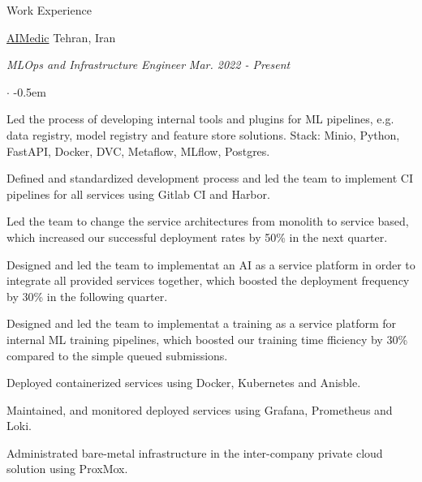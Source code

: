 \documentclass[../professional-cv.tex]{subfiles}
\begin{document}
	\begin{rSection}{Work Experience}
		
		\begin{rWorkSection}
			{\href{https://aimedic.co/}{AIMedic}}
			{Tehran, Iran}
			
			\vspace{-1em}
			{\em MLOps and Infrastructure Engineer} \hfill {\em Mar. 2022 - Present} \hspace{10pt}
			\normalfont
			\begin{list}{$\cdot$}{\leftmargin=10pt\normalfont \rightmargin=20pt}
				\itemsep -0.5em
				\item Led the process of developing internal tools and plugins for ML pipelines, e.g. data registry, model registry and feature store solutions. Stack: Minio, Python, FastAPI, Docker, DVC, Metaflow, MLflow, Postgres.
				\item Defined and standardized development process and led the team to implement CI pipelines for all services using Gitlab CI and Harbor.
				\item Led the team to change the service architectures from monolith to service based, which increased our successful deployment rates by 50\% in the next quarter.
				\item Designed and led the team to implementat an AI as a service platform in order to integrate all provided services together, which boosted the deployment frequency by 30\% in the following quarter.
				\item Designed and led the team to implementat a training as a service platform for internal ML training pipelines, which boosted our training time fficiency by 30\% compared to the simple queued submissions.
				\item Deployed containerized services using Docker, Kubernetes and Anisble.
				\item Maintained, and monitored deployed services using Grafana, Prometheus and Loki.
				\item Administrated bare-metal infrastructure in the inter-company private cloud solution using ProxMox.
						

\end{list}
\end{rWorkSection}
\end{rSection}
\end{document}
